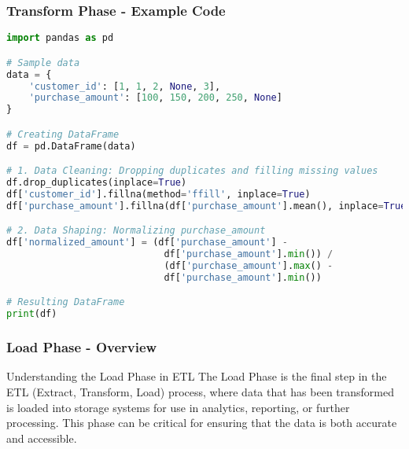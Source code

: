 \documentclass[aspectratio=169]{beamer}
\begin{document}
\begin{frame}[fragile]
    \frametitle{Transform Phase - Example Code}
    \begin{lstlisting}[language=Python]
import pandas as pd

# Sample data
data = {
    'customer_id': [1, 1, 2, None, 3],
    'purchase_amount': [100, 150, 200, 250, None]
}

# Creating DataFrame
df = pd.DataFrame(data)

# 1. Data Cleaning: Dropping duplicates and filling missing values
df.drop_duplicates(inplace=True)
df['customer_id'].fillna(method='ffill', inplace=True)
df['purchase_amount'].fillna(df['purchase_amount'].mean(), inplace=True)

# 2. Data Shaping: Normalizing purchase_amount
df['normalized_amount'] = (df['purchase_amount'] - 
                            df['purchase_amount'].min()) / 
                            (df['purchase_amount'].max() - 
                            df['purchase_amount'].min())

# Resulting DataFrame
print(df) 
    \end{lstlisting}
\end{frame}

\begin{frame}[fragile]
    \frametitle{Load Phase - Overview}
    \begin{block}{Understanding the Load Phase in ETL}
        The Load Phase is the final step in the ETL (Extract, Transform, Load) process, where data that has been transformed is loaded into storage systems for use in analytics, reporting, or further processing. This phase can be critical for ensuring that the data is both accurate and accessible.
    \end{block}
\end{frame}
\end{document}
